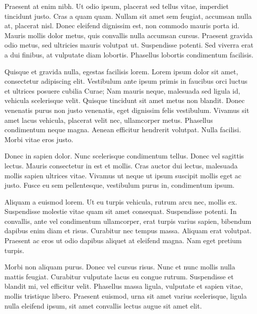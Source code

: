 Praesent at enim nibh. Ut odio ipsum, placerat sed tellus vitae, imperdiet tincidunt justo. Cras a quam quam. Nullam sit amet sem feugiat, accumsan nulla at, placerat nisl. Donec eleifend dignissim est, non commodo mauris porta id. Mauris mollis dolor metus, quis convallis nulla accumsan cursus. Praesent gravida odio metus, sed ultricies mauris volutpat ut. Suspendisse potenti. Sed viverra erat a dui finibus, at vulputate diam lobortis. Phasellus lobortis condimentum facilisis.

Quisque et gravida nulla, egestas facilisis lorem. Lorem ipsum dolor sit amet, consectetur adipiscing elit. Vestibulum ante ipsum primis in faucibus orci luctus et ultrices posuere cubilia Curae; Nam mauris neque, malesuada sed ligula id, vehicula scelerisque velit. Quisque tincidunt sit amet metus non blandit. Donec venenatis purus non justo venenatis, eget dignissim felis vestibulum. Vivamus sit amet lacus vehicula, placerat velit nec, ullamcorper metus. Phasellus condimentum neque magna. Aenean efficitur hendrerit volutpat. Nulla facilisi. Morbi vitae eros justo.

Donec in sapien dolor. Nunc scelerisque condimentum tellus. Donec vel sagittis lectus. Mauris consectetur in est et mollis. Cras auctor dui lectus, malesuada mollis sapien ultrices vitae. Vivamus ut neque ut ipsum suscipit mollis eget ac justo. Fusce eu sem pellentesque, vestibulum purus in, condimentum ipsum.

Aliquam a euismod lorem. Ut eu turpis vehicula, rutrum arcu nec, mollis ex. Suspendisse molestie vitae quam sit amet consequat. Suspendisse potenti. In convallis, ante vel condimentum ullamcorper, erat turpis varius sapien, bibendum dapibus enim diam et risus. Curabitur nec tempus massa. Aliquam erat volutpat. Praesent ac eros ut odio dapibus aliquet at eleifend magna. Nam eget pretium turpis.

Morbi non aliquam purus. Donec vel cursus risus. Nunc et nunc mollis nulla mattis feugiat. Curabitur vulputate lacus eu congue rutrum. Suspendisse et blandit mi, vel efficitur velit. Phasellus massa ligula, vulputate et sapien vitae, mollis tristique libero. Praesent euismod, urna sit amet varius scelerisque, ligula nulla eleifend ipsum, sit amet convallis lectus augue sit amet elit.


